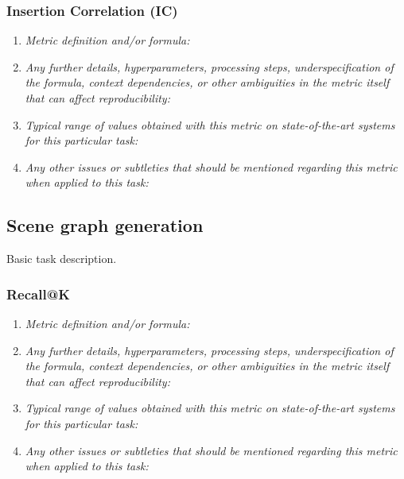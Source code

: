 \documentclass[a4paper,11pt]{article}
\begin{document}
        \subsubsection{Insertion Correlation (IC)}
            \begin{enumerate}[label=\alph*.]
                \item \textit{Metric definition and/or formula:}
                \bigskip
                \item \textit{Any further details, hyperparameters, processing steps, underspecification of the formula, context dependencies, or other ambiguities in the metric itself that can affect reproducibility:}
                \bigskip
                \item \textit{Typical range of values obtained with this metric on state-of-the-art systems for this particular task:}
                \bigskip
                \item \textit{Any other issues or subtleties that should be mentioned regarding this metric when applied to this task:}
                \bigskip
            \end{enumerate}

    \subsection{Scene graph generation}
        Basic task description.
        \subsubsection{Recall@K}
            \begin{enumerate}[label=\alph*.]
                \item \textit{Metric definition and/or formula:}
                \bigskip
                \item \textit{Any further details, hyperparameters, processing steps, underspecification of the formula, context dependencies, or other ambiguities in the metric itself that can affect reproducibility:}
                \bigskip
                \item \textit{Typical range of values obtained with this metric on state-of-the-art systems for this particular task:}
                \bigskip
                \item \textit{Any other issues or subtleties that should be mentioned regarding this metric when applied to this task:}
                \bigskip
            \end{enumerate}
\end{document}
